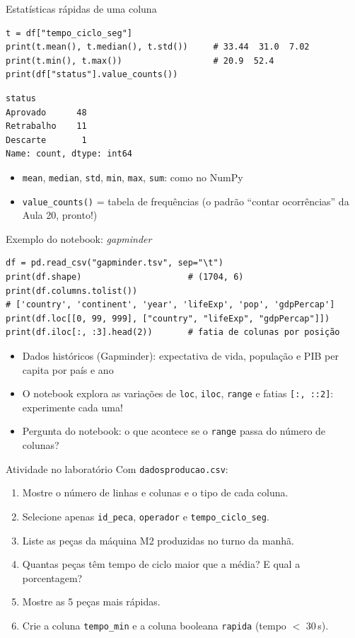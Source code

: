 \documentclass[aspectratio=169,10pt,t]{beamer}
\begin{document}
\begin{frame}[fragile]{Estatísticas rápidas de uma coluna}
\begin{lstlisting}
t = df["tempo_ciclo_seg"]
print(t.mean(), t.median(), t.std())     # 33.44  31.0  7.02
print(t.min(), t.max())                  # 20.9  52.4
print(df["status"].value_counts())
\end{lstlisting}
\begin{lstlisting}[style=saida]
status
Aprovado      48
Retrabalho    11
Descarte       1
Name: count, dtype: int64
\end{lstlisting}
  \begin{itemize}\small
    \item \texttt{mean}, \texttt{median}, \texttt{std}, \texttt{min}, \texttt{max}, \texttt{sum}: como no NumPy
    \item \texttt{value\_counts()} = tabela de frequências (o padrão ``contar ocorrências'' da Aula 20, pronto!)
  \end{itemize}
\end{frame}

\begin{frame}[fragile]{Exemplo do notebook: \emph{gapminder}}
\begin{lstlisting}
df = pd.read_csv("gapminder.tsv", sep="\t")
print(df.shape)                     # (1704, 6)
print(df.columns.tolist())
# ['country', 'continent', 'year', 'lifeExp', 'pop', 'gdpPercap']
print(df.loc[[0, 99, 999], ["country", "lifeExp", "gdpPercap"]])
print(df.iloc[:, :3].head(2))       # fatia de colunas por posição
\end{lstlisting}
  \begin{itemize}
    \item Dados históricos (Gapminder): expectativa de vida, população e PIB per capita por país e ano
    \item O notebook explora as variações de \texttt{loc}, \texttt{iloc}, \texttt{range} e fatias \texttt{[:, ::2]}: experimente cada uma!
    \item Pergunta do notebook: o que acontece se o \texttt{range} passa do número de colunas?
  \end{itemize}
\end{frame}

\begin{frame}{Atividade no laboratório}
  Com \texttt{dadosproducao.csv}:
  \begin{enumerate}
    \item Mostre o número de linhas e colunas e o tipo de cada coluna.
    \item Selecione apenas \texttt{id\_peca}, \texttt{operador} e \texttt{tempo\_ciclo\_seg}.
    \item Liste as peças da máquina M2 produzidas no turno da manhã.
    \item Quantas peças têm tempo de ciclo maior que a média? E qual a porcentagem?
    \item Mostre as 5 peças mais rápidas.
    \item Crie a coluna \texttt{tempo\_min} e a coluna booleana \texttt{rapida} (tempo \(<\) 30\,s).
  \end{enumerate}
\end{frame}
\end{document}
